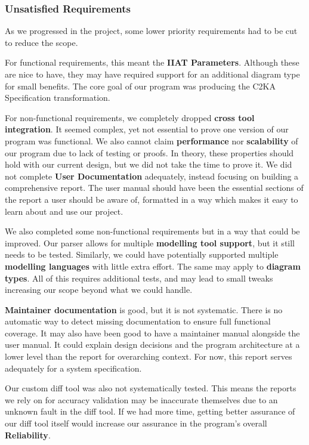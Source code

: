 \newpage
\subsubsection{Unsatisfied Requirements} \label{subsubsec:unsat-reqs}
As we progressed in the project, some lower priority requirements had to be cut to reduce the scope.

For functional requirements, this meant the \textbf{IIAT Parameters}.
Although these are nice to have, they may have required support for an additional diagram type for small benefits.
The core goal of our program was producing the C2KA Specification transformation.

For non-functional requirements, we completely dropped \textbf{cross tool integration}.
It seemed complex, yet not essential to prove one version of our program was functional.
We also cannot claim \textbf{performance} nor \textbf{scalability} of our program due to lack of testing or proofs.
In theory, these properties should hold with our current design, but we did not take the time to prove it.
We did not complete \textbf{User Documentation} adequately, instead focusing on building a comprehensive report.
The user manual should have been the essential sections of the report a user should be aware of,
formatted in a way which makes it easy to learn about and use our project.

We also completed some non-functional requirements but in a way that could be improved.
Our parser allows for multiple \textbf{modelling tool support}, but it still needs to be tested.
Similarly, we could have potentially supported multiple \textbf{modelling languages} with little extra effort.
The same may apply to \textbf{diagram types}.
All of this requires additional tests, and may lead to small tweaks increasing our scope beyond what we could handle.

\textbf{Maintainer documentation} is good, but it is not systematic.
There is no automatic way to detect missing documentation to ensure full functional coverage.
It may also have been good to have a maintainer manual alongside the user manual.
It could explain design decisions and the program architecture at a lower level than the report for overarching context.
For now, this report serves adequately for a system specification.

Our custom diff tool was also not systematically tested.
This means the reports we rely on for accuracy validation may be inaccurate themselves due to an unknown fault in the diff tool.
If we had more time, getting better assurance of our diff tool itself would increase our assurance in the program's overall
\textbf{Reliability}.

